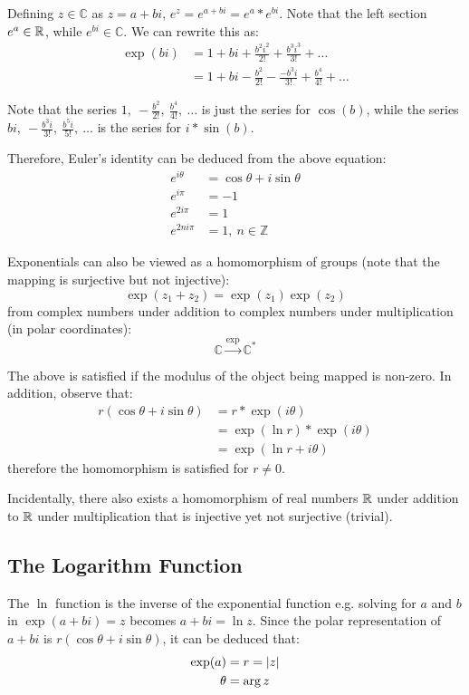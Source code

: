 \documentclass[12pt]{article}
\begin{document}
	Defining $z \in \mathbb{C}$ as $z = a + bi$, $e^z = e^{a + bi} = e^a*e^{bi}$. Note that the left section $e^a \in \mathbb{R}$, while $e^{bi} \in \mathbb{C}$. We can rewrite this as:
	\begin{align*}
		\exp(bi) &= 1 + bi + \frac{b^2i^2}{2!} + \frac{b^3i^3}{3!} + \dots \\
		&= 1 + bi - \frac{b^2}{2!} - \frac{-b^3i}{3!} + \frac{b^4}{4!} + \dots
	\end{align*}
	
	Note that the series $1,\ -\frac{b^2}{2!},\ \frac{b^4}{4!},\ \dots$ is just the series for $\cos(b)$, while the series $bi,\ -\frac{b^3i}{3!},\ \frac{b^5i}{5!},\ \dots$ is the series for $i * \sin(b)$.
	
	Therefore, Euler's identity can be deduced from the above equation: 
	\begin{align*}
		e^{i\theta} &= \cos \theta + i \sin \theta \\
		e^{i\pi} &= -1 \\
		e^{2i\pi} &= 1 \\
		e^{2ni\pi} &= 1,\ n \in \mathbb{Z}
	\end{align*}
 		
 	Exponentials can also be viewed as a homomorphism of groups (note that the mapping is surjective but not injective): $$\exp(z_1 + z_2) = \exp(z_1)\exp(z_2)$$
 	from complex numbers under addition to complex numbers under multiplication (in polar coordinates): $$\mathbb{C} \xrightarrow{\exp} \mathbb{C}^*$$

	The above is satisfied if the modulus of the object being mapped is non-zero. In addition, observe that:
	\begin{align*}
		r(\cos \theta + i\sin \theta) &= r * \exp(i\theta) \\
		&= \exp(\ln r) * \exp(i\theta) \\
		&= \exp(\ln r + i\theta)
	\end{align*}
	therefore the homomorphism is satisfied for $r \neq 0$.
	
	Incidentally, there also exists a homomorphism of real numbers $\mathbb{R}$ under addition to $\mathbb{R}$ under multiplication that is injective yet not surjective (trivial).
	
	\subsection{The Logarithm Function}
	
	The $\ln$ function is the inverse of the exponential function e.g. solving for $a$ and $b$ in $\exp(a + bi) = z$ becomes $a + bi = \ln z$. Since the polar representation of $a + bi$ is $r(\cos \theta + i\sin \theta)$, it can be deduced that:
	\begin{align*}
		\exp(a) &= r = \lvert z \rvert \\
		\theta &= \arg z
	\end{align*}
	
\end{document}
